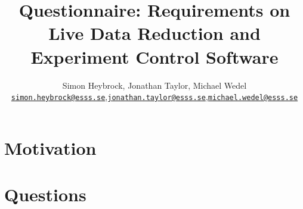 \documentclass[a4paper,english,numbers=noenddot,bibliography=totoc,chapterprefix=on,DIV=12]{scrartcl}
\begin{document}
\title{Questionnaire: Requirements on Live Data Reduction and Experiment Control Software}
\author{Simon Heybrock, Jonathan Taylor, Michael Wedel\\
    {\small\href{mailto:simon.heybrock@esss.se}{\nolinkurl{simon.heybrock@esss.se}}},{\small\href{mailto:jonathan.taylor@esss.se}{\nolinkurl{jonathan.taylor@esss.se}}},{\small\href{mailto:michael.wedel@esss.se}{\nolinkurl{michael.wedel@esss.se}}}}

\maketitle

\tableofcontents


\section{Motivation}


\section{Questions}
\end{document}
